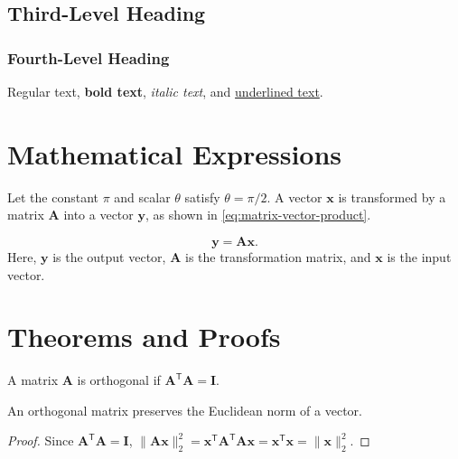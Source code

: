 \subsection{Third-Level Heading}

\subsubsection{Fourth-Level Heading}

Regular text, \textbf{bold text}, \textit{italic text}, and \underline{underlined text}.

\section{Mathematical Expressions}

\label{sym:math-symbols}
Let the constant $\pi$ and scalar $\theta$ satisfy $\theta=\pi/2$. A vector $\mathbf{x}$ is transformed
by a matrix $\mathbf{A}$ into a vector $\mathbf{y}$, as shown in \eqref{eq:matrix-vector-product}.
\begin{samepage}
\begin{equation}
    \mathbf{y}=\mathbf{A}\mathbf{x}.
    \label{eq:matrix-vector-product}
\end{equation}
\noindent Here, $\mathbf{y}$ is the output vector, $\mathbf{A}$ is the transformation matrix, and $\mathbf{x}$ is the input vector.
\par\end{samepage}

\section{Theorems and Proofs}

\begin{definition}
A matrix $\mathbf{A}$ is orthogonal if $\mathbf{A}^{\mathsf{T}}\mathbf{A}=\mathbf{I}$.
\end{definition}

\begin{theorem}
An orthogonal matrix preserves the Euclidean norm of a vector.
\end{theorem}

\begin{proof}
Since $\mathbf{A}^{\mathsf{T}}\mathbf{A}=\mathbf{I}$,
$\lVert\mathbf{A}\mathbf{x}\rVert_2^2
=\mathbf{x}^{\mathsf{T}}\mathbf{A}^{\mathsf{T}}\mathbf{A}\mathbf{x}
=\mathbf{x}^{\mathsf{T}}\mathbf{x}
=\lVert\mathbf{x}\rVert_2^2$.
\end{proof}

